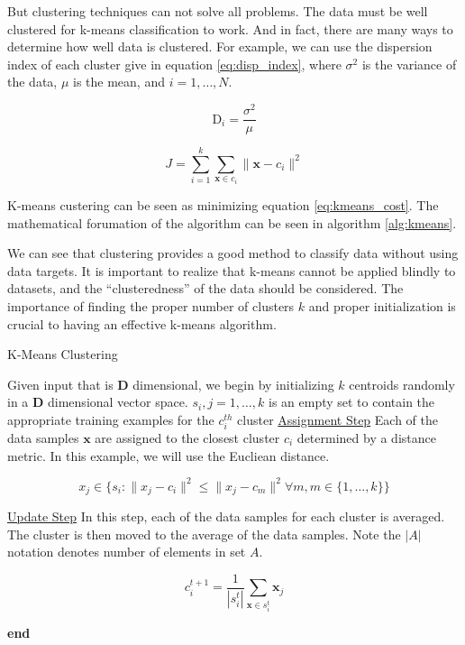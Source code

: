 \message{ !name(main.tex)}\documentclass[11pt]{article}
\begin{document}
But clustering techniques can not solve all problems. The data must be well clustered for k-means classification to work. And in fact, there are many ways to determine how well data is clustered. For example, we can use the dispersion index of each cluster give in equation \ref{eq:disp_index}, where $\sigma^{2}$ is the variance of the data, $\mu$ is the mean, and $i = 1,\ldots,N$.

\begin{equation}\label{eq:disp_index}
  \mathrm{D}_{i} = \frac{\sigma^{2}}{\mu}
\end{equation}

\begin{equation}\label{eq:kmeans_cost}
  J = \sum_{i=1}^{k}\sum_{\mathbf{x} \in c_{i}}\|\mathbf{x} - c_{i}\|^{2}
\end{equation}

K-means custering can be seen as minimizing equation \ref{eq:kmeans_cost}. The mathematical forumation of the algorithm can be seen in algorithm \ref{alg:kmeans}.

We can see that clustering provides a good method to classify data without using data targets. It is important to realize that k-means cannot be applied blindly to datasets, and the ``clusteredness'' of the data should be considered. The importance of finding the proper number of clusters $k$ and proper initialization is crucial to having an effective k-means algorithm.

\begin{algorithm}[H]
  \caption{K-Means Clustering
    \label{alg:kmeans}}
  \begin{algorithmic}[1]
    \State Given input that is \textbf{D} dimensional, we begin by initializing $k$ centroids randomly in a \textbf{D} dimensional vector space.
    \State $s_{i},j=1,\ldots,k$ is an empty set to contain the appropriate training examples for the $c_{i}^{th}$ cluster
    \State \underline{Assignment Step} Each of the data samples $\mathbf{x}$ are assigned to the closest cluster $c_{i}$ determined by a distance metric. In this example, we will use the Eucliean distance.
    
    \begin{equation}
      x_{j} \in \{s_{i} : \| x_{j} - c_{i} \|^{2} \leq \| x_{j} - c_{m} \|^{2} \forall m, m \in \{1,\ldots,k\}\}
    \end{equation}

    \State \underline{Update Step} In this step, each of the data samples for each cluster is averaged. The cluster is then moved to the average of the data samples. Note the $|A|$ notation denotes number of elements in set $A$.

    \begin{equation}
      c^{t+1}_{i} = \frac{1}{|s^{t}_{i}|}\sum_{\mathbf{x} \in s^{t}_{i}} \mathbf{x}_{j}
    \end{equation}


    \EndFor
    \State \textbf{end}
  \end{algorithmic}
\end{algorithm}
\end{document}
